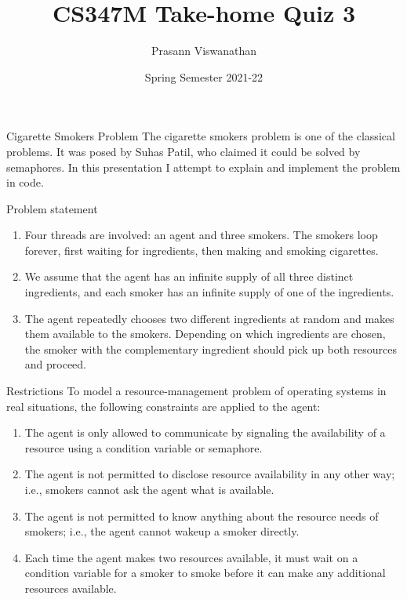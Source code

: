 \documentclass[dvipsnames]{beamer}
\title{CS347M Take-home Quiz 3}
\author{Prasann Viswanathan}
\date{Spring Semester 2021-22}
\institute[IITB]{IIT Bombay}
\theoremstyle{definition}
\begin{document}
\begin{frame}
    \titlepage
\end{frame}

\begin{frame}{Cigarette Smokers Problem}
    The cigarette smokers problem is one of the classical problems. It was posed by Suhas Patil, who claimed it could be solved by semaphores. In this presentation I attempt to explain and implement the problem in code.
\end{frame}

\begin{frame}{Problem statement}
\begin{enumerate}
    \item Four threads are involved: an agent and three smokers. The smokers loop forever, first waiting for ingredients, then making and smoking cigarettes. 
    \item We assume that the agent has an infinite supply of all three distinct ingredients, and each smoker has an infinite supply of one of the ingredients.
    \item The agent repeatedly chooses two different ingredients at random and makes them available to the smokers. Depending on which ingredients are chosen, the smoker with the complementary ingredient should pick up both resources and proceed.
\end{enumerate}
\end{frame}

\begin{frame}{Restrictions}
To model a resource-management problem of operating systems in real situations, the following constraints are applied to the agent:
\begin{enumerate}
    \item  The agent is only allowed to communicate by signaling the availability of a resource using a condition variable or semaphore.
    \item The agent is not permitted to disclose resource availability in any other way; i.e., smokers cannot ask the agent what is available.
    \item The agent is not permitted to know anything about the resource needs of smokers; i.e., the agent cannot wakeup a smoker directly.
    \item Each time the agent makes two resources available, it must wait on a condition variable for a smoker to smoke before it can make any additional resources available.
\end{enumerate}
\end{frame}
\end{document}
